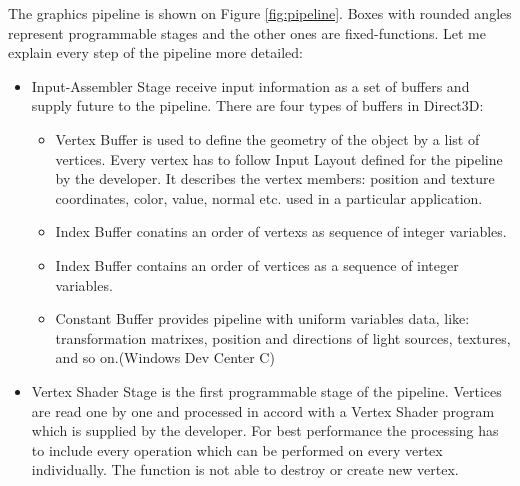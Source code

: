 \documentclass[twoside, english, 11pt]{report}
\begin{document}
The graphics pipeline is shown on Figure \ref{fig:pipeline}. Boxes with rounded angles represent programmable stages and the other ones are fixed-functions. Let me explain every step of the pipeline more detailed:

\begin{itemize}
\item Input-Assembler Stage receive input information as a set of buffers and supply future to the pipeline. There are four types of buffers in Direct3D:
  \begin{itemize}
    \item Vertex Buffer is used to define the geometry of the object by a list of vertices. Every vertex has to follow Input Layout defined for the pipeline by the developer. It describes the vertex members: position and texture coordinates, color, value, normal etc. used in a particular application.
    \item Index Buffer conatins an order of vertexs as sequence of integer variables.
    \item Index Buffer contains an order of vertices as a sequence of integer variables.
    \item Constant Buffer provides pipeline with uniform variables data, like: transformation matrixes, position and directions of light sources, textures, and so on.(Windows Dev Center C)
  \end{itemize}
\item Vertex Shader Stage is the first programmable stage of the pipeline. Vertices are read one by one and processed in accord with a Vertex Shader program which is supplied by the developer. For best performance the processing has to include every operation which can be performed on every vertex individually. The function is not able to destroy or create new vertex.


\end{itemize}
\end{document}
